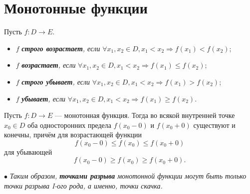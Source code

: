 \section{Монотонные функции}
Пусть $f:D \rightarrow E$.
\begin{itemize}
	\item $f$ \textit{\textbf{строго возрастает}, если} $\forall x_1,x_2 \in D, x_1 < x_2     \Rightarrow f(x_1) < f(x_2)$;
	\item $f$ \textit{\textbf{возрастает}, если} $\forall x_1,x_2 \in D, x_1 < x_2 \Rightarrow f(x_1) \leqslant f(x_2)$;
	\item $f$ \textit{\textbf{строго убывает}, если} $\forall x_1,x_2 \in D, x_1 < x_2 \Rightarrow f(x_1) > f(x_2)$;
	\item $f$ \textit{\textbf{убывает}, если} $\forall x_1,x_2 \in D, x_1 < x_2 \Rightarrow f(x_1) \geqslant f(x_2)$.
\end{itemize}
\begin{lemma}
	Пусть $f: D \rightarrow E$ --- монотонная функция. Тогда во всякой внутренней точке $x_0 \in D$ оба односторонних предела $f(x_0-0)$ и $f(x_0+0)$ существуют и конечны, причём для возрастающей функции
	$$f(x_0-0) \leqslant f(x_0) \leqslant f(x_0+0)$$
	для убывающей
	$$f(x_0-0) \geqslant f(x_0) \geqslant f(x_0+0).$$
\end{lemma}
$\bullet$ \textit{Таким образом,\textbf{ точками разрыва} монотонной функции могут быть только точки разрыва I-ого рода, а именно, точки скачка.}\\
